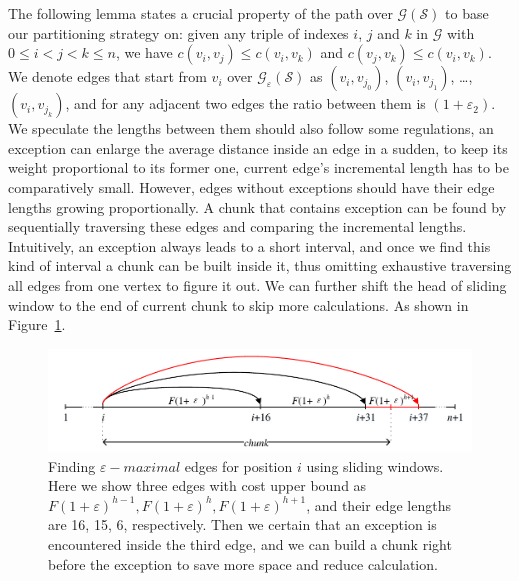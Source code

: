 \documentclass[runningheads,a4paper]{llncs}
\begin{document}
The following lemma states a crucial property of the path over $\mathcal{G}\left(\mathcal{S}\right)$ to base our partitioning strategy on:	given any triple of indexes $i$, $j$ and $k$ in $\mathcal{G}$ with $0\leqslant i<j<k\leqslant n$, we have $c(v_{i},v_{j})\leqslant c(v_{i},v_{k})$ and $c(v_{j},v_{k})\leqslant c(v_{i},v_{k})$.
We denote edges that start from $v_{i}$ over $\mathcal{G}_{\varepsilon}\left(\mathcal{S}\right)$ as $(v_{i},v_{j_{0}})$, $(v_{i},v_{j_{1}})$, \ldots, $(v_{i},v_{j_{k}})$, and for any adjacent two edges the ratio between them is $(1+\varepsilon_{2})$.
We speculate the lengths between them should also follow some regulations, an exception can enlarge the average distance inside an edge in a sudden, to keep its weight proportional to its former one, current edge's incremental length has to be comparatively small.
However, edges without exceptions should have their edge lengths growing proportionally.
A chunk that contains exception can be found by sequentially traversing these edges and comparing the incremental lengths.
Intuitively, an exception always leads to a short interval, and once we find this kind of interval a chunk can be built inside it, thus omitting exhaustive traversing all edges from one vertex to figure it out.
We can further shift the head of sliding window to the end of current chunk to skip more calculations.
As shown in Figure~\ref{fig:exceptions}.

\begin{figure}
	\centering
	\includegraphics[width=1.0\linewidth]{exception}
	\caption{Finding $\varepsilon-maximal$ edges for position $ i $ using sliding windows. Here we show three edges with cost upper bound as $ F(1+\varepsilon)^{h-1}, F(1+\varepsilon)^{h}, F(1+\varepsilon)^{h+1} $, and their edge lengths are 16, 15, 6, respectively. Then we certain that an exception is encountered inside the third edge, and we can build a chunk right before the exception to save more space and reduce calculation.}
	\label{fig:exceptions}
\end{figure}
\end{document}
